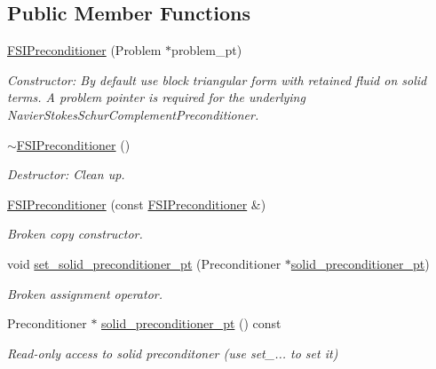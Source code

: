 \subsection*{Public Member Functions}
\begin{DoxyCompactItemize}
\item 
\hyperlink{classoomph_1_1FSIPreconditioner_aee06474cc9aabbde2dacb2cff1317a78}{F\+S\+I\+Preconditioner} (Problem $\ast$problem\+\_\+pt)
\begin{DoxyCompactList}\small\item\em Constructor\+: By default use block triangular form with retained fluid on solid terms. A problem pointer is required for the underlying Navier\+Stokes\+Schur\+Complement\+Preconditioner. \end{DoxyCompactList}\item 
\hyperlink{classoomph_1_1FSIPreconditioner_a787995de6ec09a9113b1b9a8b7c4f9cc}{$\sim$\+F\+S\+I\+Preconditioner} ()
\begin{DoxyCompactList}\small\item\em Destructor\+: Clean up. \end{DoxyCompactList}\item 
\hyperlink{classoomph_1_1FSIPreconditioner_a499de26b5f215957727155cf5f950019}{F\+S\+I\+Preconditioner} (const \hyperlink{classoomph_1_1FSIPreconditioner}{F\+S\+I\+Preconditioner} \&)
\begin{DoxyCompactList}\small\item\em Broken copy constructor. \end{DoxyCompactList}\item 
void \hyperlink{classoomph_1_1FSIPreconditioner_a0f21e38e18521e0946c3f3ec98a85baa}{set\+\_\+solid\+\_\+preconditioner\+\_\+pt} (Preconditioner $\ast$\hyperlink{classoomph_1_1FSIPreconditioner_abc97d84c4d0e7a280947855b7f33c34c}{solid\+\_\+preconditioner\+\_\+pt})
\begin{DoxyCompactList}\small\item\em Broken assignment operator. \end{DoxyCompactList}\item 
Preconditioner $\ast$ \hyperlink{classoomph_1_1FSIPreconditioner_abc97d84c4d0e7a280947855b7f33c34c}{solid\+\_\+preconditioner\+\_\+pt} () const
\begin{DoxyCompactList}\small\item\em Read-\/only access to solid preconditoner (use set\+\_\+... to set it) \end{DoxyCompactList}\item 

\end{DoxyCompactItemize}
